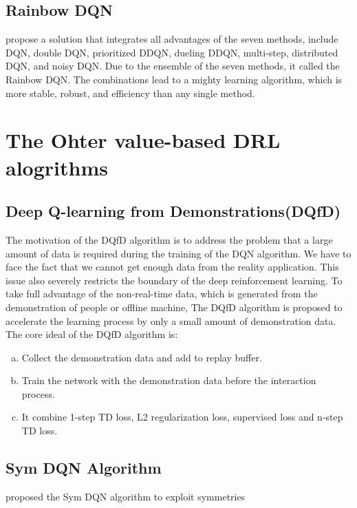 \documentclass{article}
\begin{document}
\subsection{Rainbow DQN}

\citep{matteo2017rainbow} propose a solution that integrates all advantages of the seven methods, include DQN, double DQN, prioritized DDQN, dueling DDQN, multi-step, distributed DQN, and noisy DQN. Due to the ensemble of the seven methods, it called the Rainbow DQN.  The combinations lead to a mighty learning algorithm, which is more stable, robust, and efficiency than any single method.
%
\section{The Ohter value-based DRL alogrithms}
\label{sec:The Ohter value-based DRL alogrithms}
\subsection{Deep Q-learning from Demonstrations(DQfD)}
The motivation of the DQfD algorithm \citep{1704.03732} is to address the problem that a large amount of data is required during the training of the DQN algorithm. We have to face the fact that we cannot get enough data from the reality application. This issue also severely restricts the boundary of the deep reinforcement learning. To take full advantage of the non-real-time data, which is generated from the demonstration of people or offline machine, The DQfD algorithm is proposed to accelerate the learning process by only a small amount of demonstration data. The core ideal of the DQfD algorithm is:
\begin{enumerate}[(a)]
	\item Collect the demonstration data and add to replay buffer.
	\item Train the network with the demonstration data before the interaction process.
	\item It combine 1-step TD loss, L2 regularization loss, supervised loss and n-step TD loss.
\end{enumerate}

\subsection{Sym DQN Algorithm}
\citep{1706.02999} proposed the Sym DQN algorithm to exploit symmetries 

%

%

\newpage
\appendix
 
%
\end{document}
